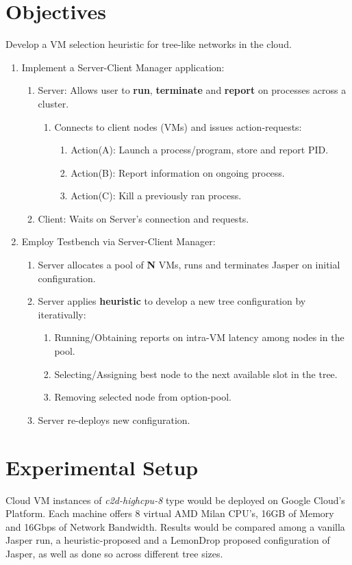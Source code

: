 \documentclass{article}
\begin{document}
\section{Objectives}
Develop a VM selection heuristic for tree-like networks in the cloud.
\begin{enumerate}
    \item Implement a Server-Client Manager application:
    \begin{enumerate}
        \item Server: Allows user to \textbf{run}, \textbf{terminate} and \textbf{report} on processes across a cluster.        
        \begin{enumerate}
            \item Connects to client nodes (VMs) and issues action-requests:
            \begin{enumerate}
                \item Action(A): Launch a process/program, store and report PID.
                \item Action(B): Report information on ongoing process.
                \item Action(C): Kill a previously ran process.
            \end{enumerate}
        \end{enumerate}
        \item Client: Waits on Server's connection and requests.
    \end{enumerate}
    \item Employ Testbench via Server-Client Manager:
    \begin{enumerate}
        \item Server allocates a pool of \textbf{N} VMs, runs and terminates Jasper on initial configuration.
        \item Server applies \textbf{heuristic} to develop a new tree configuration by iterativally:
            \begin{enumerate}
                \item Running/Obtaining reports on intra-VM latency among nodes in the pool.
                \item Selecting/Assigning best node to the next available slot in the tree.
                \item Removing selected node from option-pool.
            \end{enumerate}
        \item Server re-deploys new configuration.
    \end{enumerate}
\end{enumerate}

\section{Experimental Setup}
Cloud VM instances of \textit{c2d-highcpu-8} type would be deployed on Google Cloud's Platform. 
Each machine offers 8 virtual AMD Milan CPU's, 16GB of Memory and 16Gbps of Network Bandwidth. 
Results would be compared among a vanilla Jasper run, a heuristic-proposed 
and a LemonDrop proposed configuration of Jasper, as well as done so across different tree sizes.


    
\end{document}
